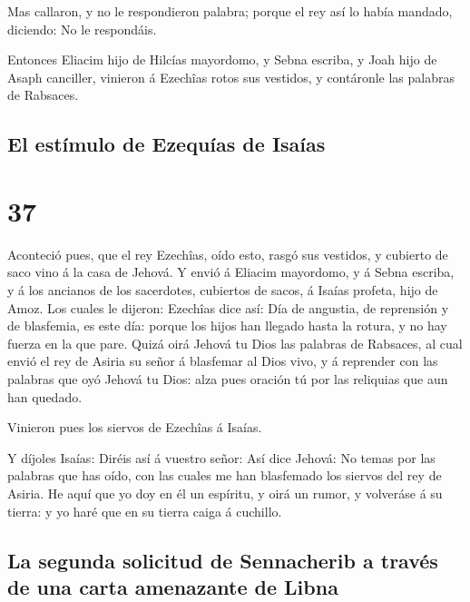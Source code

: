  Mas callaron, y no le respondieron palabra; porque el rey
así lo había mandado, diciendo: No le respondáis.

 Entonces Eliacim hijo de Hilcías mayordomo, y Sebna
escriba, y Joah hijo de Asaph canciller, vinieron á Ezechîas rotos sus
vestidos, y contáronle las palabras de Rabsaces.

\hypertarget{el-estuxedmulo-de-ezequuxedas-de-isauxedas}{%
\subsection{El estímulo de Ezequías de
Isaías}\label{el-estuxedmulo-de-ezequuxedas-de-isauxedas}}

\hypertarget{section-36}{%
\section{37}\label{section-36}}

 Aconteció pues, que el rey Ezechîas, oído esto, rasgó sus
vestidos, y cubierto de saco vino á la casa de Jehová.  Y
envió á Eliacim mayordomo, y á Sebna escriba, y á los ancianos de los
sacerdotes, cubiertos de sacos, á Isaías profeta, hijo de Amoz.
 Los cuales le dijeron: Ezechîas dice así: Día de angustia,
de reprensión y de blasfemia, es este día: porque los hijos han llegado
hasta la rotura, y no hay fuerza en la que pare.  Quizá oirá
Jehová tu Dios las palabras de Rabsaces, al cual envió el rey de Asiria
su señor á blasfemar al Dios vivo, y á reprender con las palabras que
oyó Jehová tu Dios: alza pues oración tú por las reliquias que aun han
quedado.

 Vinieron pues los siervos de Ezechîas á Isaías.

 Y díjoles Isaías: Diréis así á vuestro señor: Así dice
Jehová: No temas por las palabras que has oído, con las cuales me han
blasfemado los siervos del rey de Asiria.  He aquí que yo
doy en él un espíritu, y oirá un rumor, y volveráse á su tierra: y yo
haré que en su tierra caiga á cuchillo.

\hypertarget{la-segunda-solicitud-de-sennacherib-a-travuxe9s-de-una-carta-amenazante-de-libna}{%
\subsection{La segunda solicitud de Sennacherib a través de una carta
amenazante de
Libna}\label{la-segunda-solicitud-de-sennacherib-a-travuxe9s-de-una-carta-amenazante-de-libna}}

